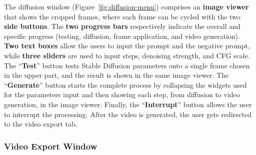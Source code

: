\documentclass[preprint]{elsarticle}
\begin{document}
The diffusion window (Figure~\ref{fig:diffusion-menu}) comprises an \textbf{image viewer} that 
shows the cropped frames, where each frame can be cycled with the two \textbf{side buttons}. 
The \textbf{two progress bars} respectively indicate the overall and 
specific progress (testing, diffusion, frame application, and video generation). 
\textbf{Two text boxes} allow the users to input the prompt and the negative prompt, 
while \textbf{three sliders} are used to input steps, denoising strength, and CFG scale. 
The ``\textbf{Test}'' button tests Stable Diffusion parameters onto a single frame chosen 
in the upper part, and the result is shown in the same image viewer. 
The ``\textbf{Generate}'' button starts the complete process by collapsing the widgets used 
for the parameters input and then showing each step, from diffusion to video generation, 
in the image viewer. 
Finally, the ``\textbf{Interrupt}'' button allows the user to interrupt the processing. 
After the video is generated, the user gets redirected to the video export tab.

\subsubsection{Video Export Window}
\end{document}
